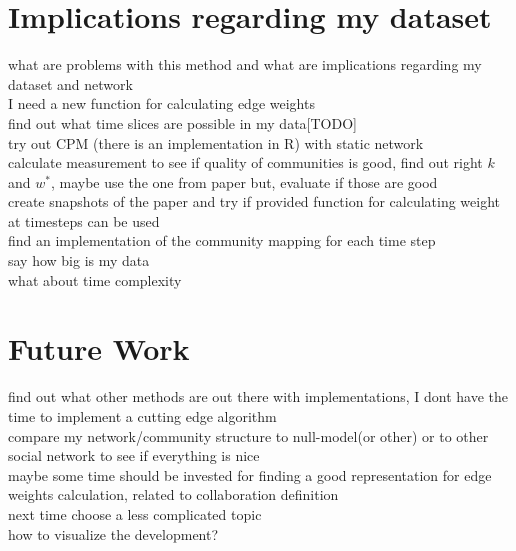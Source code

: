 \documentclass[runningheads,a4paper]{llncs}
\begin{document}
\section{Implications regarding my dataset}
what are problems with this method and what are implications regarding my dataset and network\\
I need a new function for calculating edge weights\\
find out what time slices are possible in my data[TODO]\\
try out CPM (there is an implementation in R) with static network\\
calculate measurement to see if quality of communities is good, find out right $k$ and $w^*$, maybe use the one from paper but, evaluate if those are good\\
create snapshots of the paper and try if provided function for calculating weight at timesteps can be used\\
find an implementation of the community mapping for each time step\\

say how big is my data\\
what about time complexity\\

\section{Future Work}
find out what other methods are out there with implementations, I dont have the time to implement a cutting edge algorithm\\
compare my network/community structure to null-model(or other) or to other social network to see if everything is nice\\
maybe some time should be invested for finding a good representation for edge weights calculation, related to collaboration definition\\
next time choose a less complicated topic\\
how to visualize the development?

{
	
	
}
\end{document}
